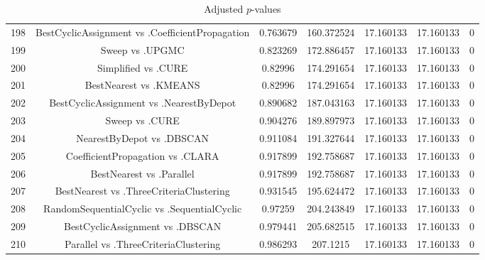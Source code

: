 \documentclass[a4paper,10pt]{article}
\begin{document}
\begin{landscape}
\begin{table}[!htp]
\begin{tabular}{ccccccc}
198&BestCyclicAssignment vs .CoefficientPropagation&0.763679&160.372524&17.160133&17.160133&0\\
199&Sweep vs .UPGMC&0.823269&172.886457&17.160133&17.160133&0\\
200&Simplified vs .CURE&0.82996&174.291654&17.160133&17.160133&0\\
201&BestNearest vs .KMEANS&0.82996&174.291654&17.160133&17.160133&0\\
202&BestCyclicAssignment vs .NearestByDepot&0.890682&187.043163&17.160133&17.160133&0\\
203&Sweep vs .CURE&0.904276&189.897973&17.160133&17.160133&0\\
204&NearestByDepot vs .DBSCAN&0.911084&191.327644&17.160133&17.160133&0\\
205&CoefficientPropagation vs .CLARA&0.917899&192.758687&17.160133&17.160133&0\\
206&BestNearest vs .Parallel&0.917899&192.758687&17.160133&17.160133&0\\
207&BestNearest vs .ThreeCriteriaClustering&0.931545&195.624472&17.160133&17.160133&0\\
208&RandomSequentialCyclic vs .SequentialCyclic&0.97259&204.243849&17.160133&17.160133&0\\
209&BestCyclicAssignment vs .DBSCAN&0.979441&205.682515&17.160133&17.160133&0\\
210&Parallel vs .ThreeCriteriaClustering&0.986293&207.1215&17.160133&17.160133&0\\
\hline
\end{tabular}
\caption{Adjusted $p$-values}
\end{table}

\end{landscape}
\end{document}
